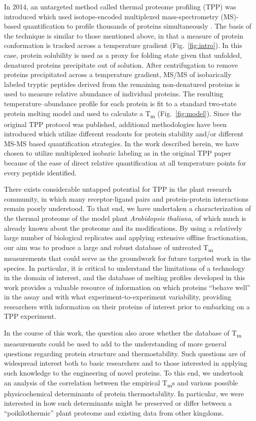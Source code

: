 \documentclass[11pt,letter]{article}\usepackage[]{graphicx}\usepackage[]{color}
\newcommand{\Tm}{T\textsubscript{m}}
\begin{document}
In 2014, an untargeted method called thermal proteome profiling (TPP) was
introduced which used isotope-encoded multiplexed mass-spectrometry (MS)-based
quantification to profile thousands of proteins simultaneously
\cite{savitski_tracking_2014}. The basis of the technique is similar to those
mentioned above, in that a measure of protein conformation is tracked across a
temperature gradient (Fig.\ \ref{fig:intro}). In this case, protein solubility
is used as a proxy for folding state given that unfolded, denatured proteins
precipitate out of solution. After centrifugation to remove proteins
precipitated across a temperature gradient, MS/MS of isobarically labeled
tryptic peptides derived from the remaining non-denatured proteins is used to
measure relative abundance of individual proteins. The resulting
temperature--abundance profile for each protein is fit to a standard two-state
protein melting model and used to calculate a \Tm{} (Fig.\ \ref{fig:model}).
Since the original TPP protocol was published, additional methodologies have
been introduced which utilize different readouts for protein stability and/or
different MS-MS based quantification strategies. In the work described herein,
we have chosen to utilize multiplexed isobaric labeling as in the original TPP
paper because of the ease of direct relative quantification at all temperature
points for every peptide identified.

There exists considerable untapped potential for TPP in the plant research
community, in which many receptor-ligand pairs and protein-protein
interactions remain poorly understood. To that end, we have undertaken a
characterization of the thermal proteome of the model plant
\textit{Arabidopsis thaliana}, of which much is already known about the
proteome and its modifications. By using a relatively large number of
biological replicates and applying extensive offline fractionation, our aim
was to produce a large and robust database of untreated \Tm{} measurements
that could serve as the groundwork for future targeted work in the species. In
particular, it is critical to understand the limitations of a technology in
the domain of interest, and the database of melting profiles developed in this
work provides a valuable resource of information on which proteins ``behave
well'' in the assay and with what experiment-to-experiment variability,
providing researchers with information on their proteins of interest prior to
embarking on a TPP experiment.

In the course of this work, the question also arose whether the database of
\Tm{} measurements could be used to add to the understanding of more general
questions regarding protein structure and thermostability. Such questions are
of widespread interest both to basic researchers and to those interested in
applying such knowledge to the engineering of novel proteins. To this end, we
undertook an analysis of the correlation between the empirical \Tm{}s and
various possible physicochemical determinants of protein thermostability. In
particular, we were interested in how such determinants might be preserved or
differ between a ``poikilothermic'' plant proteome and existing data from
other kingdoms.
\end{document}
